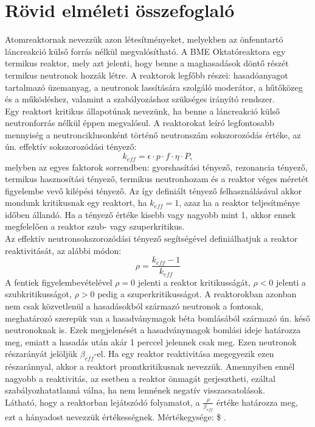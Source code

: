 \documentclass[12pt,a4paper]{article}
\begin{document}
\section{Rövid elméleti összefoglaló}
\hspace*{10pt} Atomreaktornak nevezzük azon létesítményeket, melyekben az önfenntartó láncreakció külső forrás nélkül megvalósítható. A BME Oktatóreaktora egy termikus reaktor, mely azt jelenti, hogy benne a maghasadások döntő részét termikus neutronok hozzák létre. A reaktorok legfőbb részei: hasadóanyagot tartalmazó üzemanyag, a neutronok lassítására szolgáló moderátor,   a hűtőközeg és a működéshez, valamint a szabályozáshoz szükséges irányító rendszer.\\ 
\hspace*{10pt} Egy reaktort kritikus állapotúnak nevezünk, ha benne a láncreakció külső neutronforrás nélkül éppen megvalósul. A reaktorokat leíró legfontosabb mennyiség a neutronciklusonként történő neutronszám sokszorozódás értéke, az ún. effektív sokszorozódási tényező: 
\begin{equation}
k_{eff}=\epsilon \cdot p \cdot f \cdot \eta \cdot P,
\end{equation}
melyben az egyes faktorok sorrendben:
gyorshasítási tényező, rezonancia tényező, termikus hasznosítási tényező, termikus neutronhozam és a reaktor véges méretét figyelembe vevő kilépési tényező. Az így definiált tényező felhasználásával akkor mondunk kritikusnak egy reaktort, ha $k_{eff}=1$, azaz ha a reaktor teljesítménye időben állandó. Ha a tényező értéke kisebb vagy nagyobb mint 1, akkor ennek megfelelően a reaktor szub- vagy szuperkritikus.\\
\hspace*{10pt} Az effektív neutronsokszorozódási tényező segítségével definiálhatjuk a reaktor reaktivitását, az alábbi módon:
\begin{equation}
\rho=\frac{k_{eff}-1}{k_{eff}}
\end{equation}
A fentiek figyelembevételével $\rho=0$ jelenti a reaktor kritikusságát, $\rho<0$ jelenti a szubkritikusságot, $\rho>0$ pedig a szuperkritikusságot. A reaktorokban azonban nem csak közvetlenül a hasadásokból származó neutronok a fontosak, meghatározó szerepük van a hasadványmagok béta bomlásából származó ún. késő neutronoknak is. Ezek megjelenését a hasadványmagok bomlási ideje határozza meg, emiatt a hasadás után akár 1 perccel jelennek csak meg. Ezen neutronok részarányát jelöljük $\beta _{eff}$-el. Ha egy reaktor reaktivitása megegyezik ezen részaránnyal, akkor a reaktort promtkritikusnak nevezzük. Amennyiben ennél nagyobb a reaktivitás, az esetben a reaktor önmagát gerjesztheti, ezáltal szabályozhatatlanná válna, ha nem lennének negatív visszacsatolások.\\
\hspace*{10pt} Látható, hogy a reaktorban lejátszódó folyamatot, a $\frac{\rho}{\beta_{eff}}$ értéke határozza meg, ezt a hányadost nevezzük értékességnek. Mértékegysége: \$ . 
\end{document}
